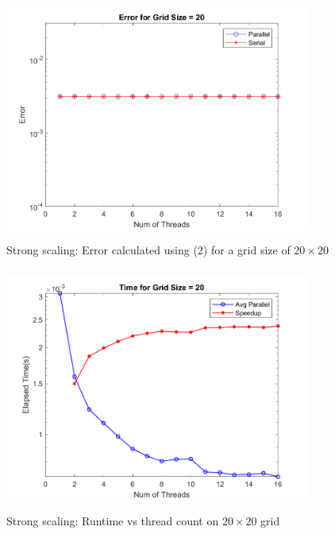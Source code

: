 \documentclass[12pt]{article}
\begin{document}
	\begin{figure}[H]
		\centering
		\includegraphics[width=100mm,height=80mm]{errorVthread20.png}
		\caption{Strong scaling: Error calculated using (2) for a grid size of $20\times20$}
	\end{figure}
	\begin{figure}[H]
		\centering
		\includegraphics[width=100mm,height=80mm]{timeVthread20.png}
		\caption{Strong scaling: Runtime vs thread count on $20\times20$ grid}
	\end{figure}
\end{document}
